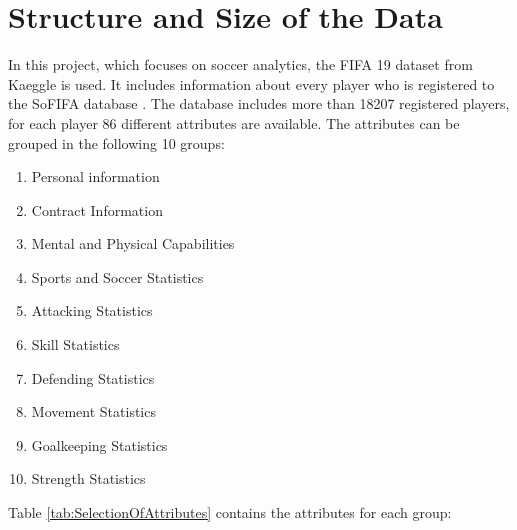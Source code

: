 \documentclass[runningheads]{llncs}
\begin{document}
\section{Structure and Size of the Data}
In this project, which focuses on soccer analytics, the FIFA 19 dataset from Kaeggle is used. It includes information about every player who is registered to the SoFIFA database \cite{ref_sofifa}. 
The database includes more than 18207 registered players, for each player 86 different attributes are available. The attributes can be grouped in the following 10 groups: 
\begin{multicols}{2}
	\begin{enumerate}
	\item Personal information
	\item Contract Information
	\item Mental and Physical Capabilities
	\item Sports and Soccer Statistics
	\item Attacking Statistics  
	\item Skill Statistics
	\item Defending Statistics
	\item Movement Statistics
	\item Goalkeeping Statistics
	\item Strength Statistics
\end{enumerate}
\end{multicols}

Table \ref{tab:SelectionOfAttributes} contains the attributes for each group:
\end{document}
